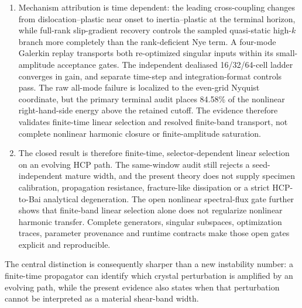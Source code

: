 \begin{enumerate}
\item Mechanism attribution is time dependent: the leading cross-coupling
changes from dislocation--plastic near onset to inertia--plastic at the
terminal horizon, while full-rank slip-gradient recovery controls the sampled
quasi-static high-$k$ branch more completely than the rank-deficient Nye term.
A four-mode Galerkin replay transports both re-optimized singular inputs
within its small-amplitude acceptance gates.  The independent dealiased
16/32/64-cell ladder converges in gain, and separate time-step and
integration-format controls pass.  The raw all-mode failure is localized to
the even-grid Nyquist coordinate, but the primary terminal audit places
84.58\% of the nonlinear right-hand-side energy above the retained cutoff.  The evidence therefore
validates finite-time linear selection and resolved finite-band transport, not
complete nonlinear harmonic closure or finite-amplitude saturation.

\item The closed result is therefore finite-time, selector-dependent linear
selection on an evolving HCP path. The same-window audit still rejects a
seed-independent mature width, and the present theory does not supply
specimen calibration, propagation resistance, fracture-like dissipation or a
strict HCP-to-Bai analytical degeneration.  The open nonlinear spectral-flux
gate further shows that finite-band linear selection alone does not regularize
nonlinear harmonic transfer. Complete generators, singular
subspaces, optimization traces, parameter provenance and runtime contracts
make those open gates explicit and reproducible.
\end{enumerate}

The central distinction is consequently sharper than a new instability
number: a finite-time propagator can identify which crystal perturbation is
amplified by an evolving path, while the present evidence also states when
that perturbation cannot be interpreted as a material shear-band width.
